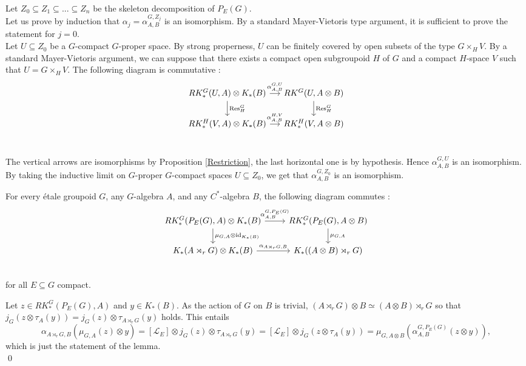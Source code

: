 \begin{dem}
Let $Z_0\subseteq Z_1\subseteq ... \subseteq Z_n $ be the skeleton decomposition of $P_E(G)$.\\

Let us prove by induction that $\alpha_j=\alpha^{G,Z_j}_{A,B}$ is an isomorphism. By a standard Mayer-Vietoris type argument, %
it is sufficient to prove the statement for $j=0$.\\

Let $U\subseteq Z_0$ be a $G$-compact $G$-proper space. By strong properness, $U$ can be finitely covered by open subsets of the type $G \times_H V$. By a standard Mayer-Vietoris argument, we can suppose that there exists a compact open subgroupoid $H$ of $G$ and a compact $H$-space $V$ such that $U = G \times_H V$. The following diagram is commutative :
\[\begin{tikzcd}[column sep = small] 
RK_*^G(U,A)\otimes K_*(B) \arrow{r}{\alpha_{A,B}^{G,U}} \arrow{d}{\text{Res}_H^G} & RK^G(U, A\otimes B) \arrow{d}{\text{Res}_H^G}\\
RK_*^H(V, A)\otimes K_*(B) \arrow{r}{\alpha_{ A,B}^{H,V}} & 
	RK_*^H(V,  A\otimes B)\\
\end{tikzcd}\]

The vertical arrows are isomorphisms by Proposition \ref{Restriction}, the last horizontal one is by hypothesis. Hence $\alpha_{A,B}^{G,U}$ is an isomorphism. By taking the inductive limit on $G$-proper $G$-compact spaces $U\subseteq Z_0$, we get that $\alpha_{A,B}^{G,Z_0}$ is an isomorphism.
\end{dem}

\begin{lem}\label{KunnethLemma}
For every étale groupoid $G$, any $G$-algebra $A$, and any $C^*$-algebra $B$, the following diagram commutes :
\[\begin{tikzcd}
RK_*^G(P_E(G),A)\otimes K_*(B) \arrow{r}{\alpha^{G,P_E(G)}_{A,B}}\arrow{d}{\mu_{G,A}\otimes \text{id}_{K_*(B)}} & 
RK_*^G(P_E(G),A\otimes B) \arrow{d}{\mu_{G,A}} \\
K_*(A\rtimes_r G)\otimes K_*(B) \arrow{r}{\alpha_{A\rtimes_r G,B}} & 
K_*((A\otimes B)\rtimes_r G)\\
\end{tikzcd}\] 
for all $E\subseteq G$ compact. 
\end{lem}

\begin{dem}
Let $z\in RK_*^G(P_E(G),A)$ and $y\in K_*(B)$. As the action of $G$ on $B$ is trivial, $(A\rtimes_r G)\otimes B\simeq (A\otimes B)\rtimes_r G$ so that $j_G(z \otimes \tau_A(y))= j_G(z) \otimes \tau_{A\rtimes_r G}(y)$ holds. This entails
\[\alpha_{A\rtimes_r G, B}(\mu_{G,A}(z)\otimes y)= [\mathcal L_E] \otimes j_G(z)\otimes \tau_{A\rtimes_r G}(y) = 
[\mathcal L_E] \otimes j_G( z\otimes \tau_A(y) ) = \mu_{G,A\otimes B}(\alpha^{G,P_E(G)}_{A,B}(z\otimes y)) ,\]
which is just the statement of the lemma.\\
\qed
\end{dem}

